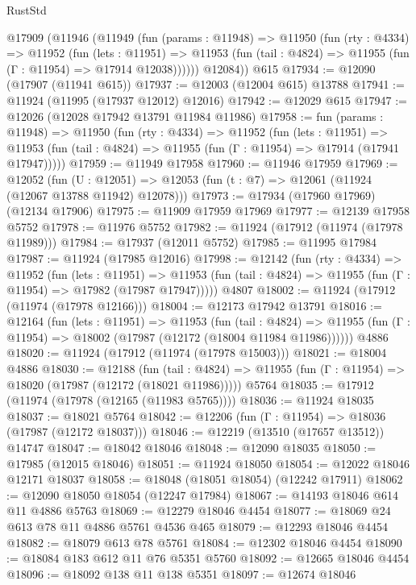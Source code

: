\begin{lexlean}{RustStd}
\begin{coremodule}
{\begin{coremodule}
{{{{{{{{{{{{{{{{{{{{{{{{{{{{{{{{{{{{{{{{{{{{{{{{{{{{{{{{{{{{{{{{{{{{{{{{{{{{{{{{    @17909
      (@11946
        (@11949
          (fun (params : @11948) =>
          @11950
            (fun (rty : @4334) =>
            @11952
              (fun (lets : @11951) =>
              @11953 (fun (tail : @4824) => @11955 (fun (Γ : @11954) => @17914 @12038))))))
        @12084))
    @615
@17934 := @12090 (@17907 (@11941 @615))
@17937 := @12003 (@12004 @615) @13788
@17941 := @11924 (@11995 (@17937 @12012) @12016)
@17942 := @12029 @615
@17947 := @12026 (@12028 @17942 @13791 @11984 @11986)
@17958 := fun (params : @11948) =>
  @11950
    (fun (rty : @4334) =>
    @11952
      (fun (lets : @11951) =>
      @11953 (fun (tail : @4824) => @11955 (fun (Γ : @11954) => @17914 (@17941 @17947)))))
@17959 := @11949 @17958
@17960 := @11946 @17959
@17969 := @12052
    (fun (U : @12051) => @12053 (fun (t : @7) => @12061 (@11924 (@12067 @13788 @11942) @12078)))
@17973 := @17934 (@17960 @17969) (@12134 @17906)
@17975 := @11909 @17959 @17969
@17977 := @12139 @17958 @5752
@17978 := @11976 @5752
@17982 := @11924 (@17912 (@11974 (@17978 @11989)))
@17984 := @17937 (@12011 @5752)
@17985 := @11995 @17984
@17987 := @11924 (@17985 @12016)
@17998 := @12142
    (fun (rty : @4334) =>
    @11952
      (fun (lets : @11951) =>
      @11953 (fun (tail : @4824) => @11955 (fun (Γ : @11954) => @17982 (@17987 @17947)))))
    @4807
@18002 := @11924 (@17912 (@11974 (@17978 @12166)))
@18004 := @12173 @17942 @13791
@18016 := @12164
    (fun (lets : @11951) =>
    @11953
      (fun (tail : @4824) =>
      @11955 (fun (Γ : @11954) => @18002 (@17987 (@12172 (@18004 @11984 @11986))))))
    @4886
@18020 := @11924 (@17912 (@11974 (@17978 @15003)))
@18021 := @18004 @4886
@18030 := @12188
    (fun (tail : @4824) => @11955 (fun (Γ : @11954) => @18020 (@17987 (@12172 (@18021 @11986)))))
    @5764
@18035 := @17912 (@11974 (@17978 (@12165 (@11983 @5765))))
@18036 := @11924 @18035
@18037 := @18021 @5764
@18042 := @12206 (fun (Γ : @11954) => @18036 (@17987 (@12172 @18037)))
@18046 := @12219 (@13510 (@17657 @13512)) @14747
@18047 := @18042 @18046
@18048 := @12090 @18035
@18050 := @17985 (@12015 @18046)
@18051 := @11924 @18050
@18054 := @12022 @18046 @12171 @18037
@18058 := @18048 (@18051 @18054) (@12242 @17911)
@18062 := @12090 @18050 @18054 (@12247 @17984)
@18067 := @14193 @18046 @614 @11 @4886 @5763
@18069 := @12279 @18046 @4454
@18077 := @18069 @24 @613 @78 @11 @4886 @5761 @4536 @465
@18079 := @12293 @18046 @4454
@18082 := @18079 @613 @78 @5761
@18084 := @12302 @18046 @4454
@18090 := @18084 @183 @612 @11 @76 @5351 @5760
@18092 := @12665 @18046 @4454
@18096 := @18092 @138 @11 @138 @5351
@18097 := @12674 @18046
}}}}}}}}}}}}}}}}}}}}}}}}}}}}}}}}}}}}}}}}}}}}}}}}}}}}}}}}}}}}}}}}}}}}}}}}}}}}}}}}
\end{coremodule}}
\end{coremodule}
\end{lexlean}
